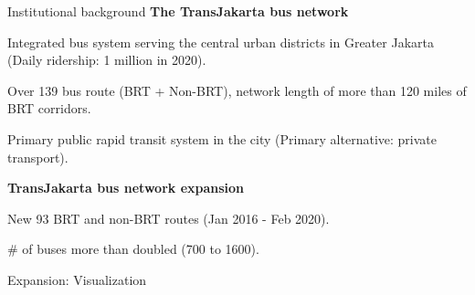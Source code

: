 \documentclass[notes,11pt, aspectratio=169]{beamer}
\newenvironment{wideitemize}{\itemize\addtolength{\itemsep}{0.4em}}{\enditemize}
\begin{document}
\begin{frame}{Institutional background}
	\textbf{The TransJakarta bus network}	
	\begin{wideitemize}
		\item Integrated bus system serving the central urban districts in Greater Jakarta (Daily ridership: 1 million in 2020).
		\item Over 139 bus route (BRT + Non-BRT), network length of more than 120 miles of BRT corridors.
		\item Primary public rapid transit system in the city (Primary alternative: private transport).
		\end{wideitemize}\vspace{1em}

	\textbf{TransJakarta bus network expansion}
	\begin{wideitemize}
	\item New 93 BRT and non-BRT routes (Jan 2016 - Feb 2020).
	\item \# of buses more than doubled (700 to 1600).
	\end{wideitemize}
\end{frame}

\begin{frame}{Expansion: Visualization}
	\begin{figure}
	\end{figure}
\end{frame}
\end{document}
